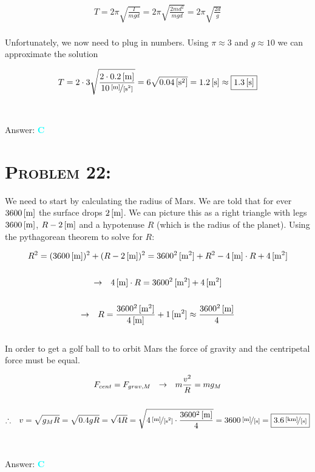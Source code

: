 \documentclass{article}
\begin{document}
\begin{gather}
T = 2 \pi \sqrt{\frac{I}{mgd}} = 2 \pi \sqrt{\frac{2md^{2}}{mgd}} = 2 \pi \sqrt{\frac{2d}{g}} \nonumber
\end{gather}
\\
Unfortunately, we now need to plug in numbers. Using $\pi \approx 3$ and $g \approx 10$ we can approximate the solution

\begin{gather}
T = 2 \cdot 3 \sqrt{\frac{2 \cdot \unit[0.2]{[m]}}{\unitfrac[10]{[m]}{[s^{2}]}}}  = 6 \sqrt{\unit[0.04]{[s^{2}]}} = \unit[1.2]{[s]} \approx \boxed{\unit[1.3]{[s]}} \nonumber
\end{gather} 
\\\\
Answer: \textbf{\textcolor{cyan}C}\\


\section{\textsc{Problem 22:}} We need to start by calculating the radius of Mars. We are told that for ever $\unit[3600]{[m]}$ the surface drops $\unit[2]{[m]}$. We can picture this as a right triangle with legs $\unit[3600]{[m]}$, $R - \unit[2]{[m]}$ and a hypotenuse $R$ (which is the radius of the planet). Using the pythagorean theorem to solve for $R$:

\begin{gather}
R^{2} = (\unit[3600]{[m]})^{2} + (R - \unit[2]{[m]})^{2} = \unit[3600^{2}]{[m^{2}]} + R^{2} - \unit[4]{[m]} \cdot R +\unit[4]{[m^{2}]}\nonumber\\
\nonumber\\
\rightarrow \hspace{.1in} \unit[4]{[m]}\cdot R = \unit[3600^{2}]{[m^{2}]} + \unit[4]{[m^{2}]}\nonumber\\
\nonumber\\
\rightarrow \hspace{.1in} R = \frac{\unit[3600^{2}]{[m^{2}]}}{\unit[4]{[m]}} + \unit[1]{[m^{2}]} \approx \frac{\unit[3600^{2}]{[m]}}{4}\nonumber
\end{gather}
\\
In order to get a golf ball to to orbit Mars the force of gravity and the centripetal force must be equal.

\begin{gather}
F_{cent} = F_{grav, M} \hspace{.1in} \rightarrow \hspace{.1in} m \frac{v^{2}}{R} = mg_{M}\nonumber\\
\nonumber\\
\therefore \hspace{.1in} v = \sqrt{g_{M}R} = \sqrt{0.4gR} = \sqrt{4R} = \sqrt{\unitfrac[4]{[m]}{[s^{2}]} \cdot \frac{\unit[3600^{2}]{[m]}}{4}} = \unitfrac[3600]{[m]}{[s]} = \boxed{\unitfrac[3.6]{[km]}{[s]}}\nonumber
\end{gather}
\\\\
Answer: \textbf{\textcolor{cyan}C}\\
\end{document}
